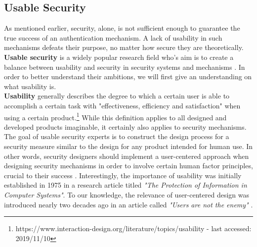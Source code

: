 \subsection{Usable Security}

As mentioned earlier, security, alone, is not sufficient enough to guarantee the true success of an authentication mechanism. A lack of usability in such mechanisms defeats their purpose, no matter how secure they are theoretically. \textbf{Usable security} is a widely popular research field who's aim is to create a balance between usability and security in security systems and mechanisms \cite{Realpe-Munoz}. In order to better understand their ambitions, we will first give an understanding on what usability is. \\

\textbf{Usability} generally describes the degree to which a certain user is able to accomplish a certain task with "effectiveness, efficiency and satisfaction" when using a certain product.\footnote{https://www.interaction-design.org/literature/topics/usability - last accessed: 2019/11/10} While this definition applies to all designed and developed products imaginable, it certainly also applies to security mechanisms. The goal of usable security experts is to construct the design process for a security measure similar to the design for any product intended for human use. In other words, security designers should implement a user-centered approach when designing security mechanisms in order to involve certain human factor principles, crucial to their success \cite{Adams:1999:UE:322796.322806, sasse}. Interestingly, the importance of usability was initially established in 1975 in a research article titled \textit{"The Protection of Information in Computer Systems"}. To our knowledge, the relevance of user-centered design was introduced nearly two decades ago in an article called \textit{"Users are not the enemy"} \cite{Adams:1999:UE:322796.322806}. \\

